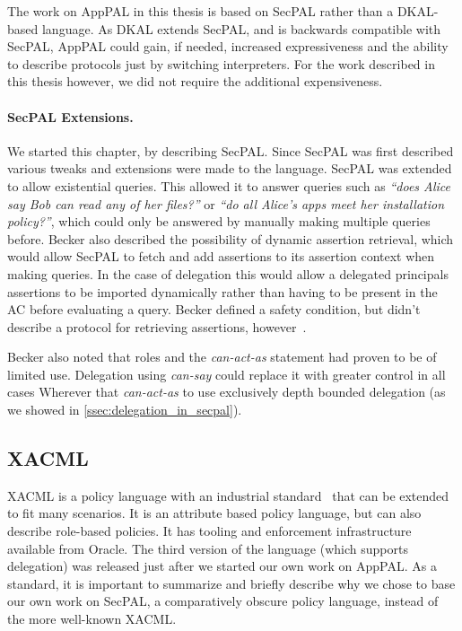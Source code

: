 \documentclass[thesis.tex]{subfiles}
\begin{document}
The work on AppPAL in this thesis is based on SecPAL rather than a DKAL-based language. 
As DKAL extends SecPAL, and is backwards compatible with SecPAL, AppPAL could gain, if needed,
increased expressiveness and the ability to describe protocols just by switching interpreters.
For the work described in this thesis however, we did not require the additional expensiveness.

\paragraph*{SecPAL Extensions.}
We started this chapter, by describing SecPAL. Since SecPAL was first described
various tweaks and extensions were made to the language. SecPAL was extended to
allow existential queries. This allowed it to answer
queries such as \emph{``does Alice say Bob can read any of her files?''} or
\emph{``do all Alice's apps meet her installation policy?''}, which could only
be answered by manually making multiple queries before. 
%
Becker also described the possibility of dynamic assertion retrieval, which
would allow SecPAL to fetch and add assertions to its assertion context when
making queries. In the case of delegation this would allow a delegated
principals assertions to be imported dynamically rather than having to be
present in the AC before evaluating a query. Becker defined a safety condition,
but didn't describe a protocol for retrieving assertions,
however~\cite{moritz_y_becker_secpal:_2009}.

Becker also noted that roles and the \emph{can-act-as} statement had proven to
be of limited use. Delegation using \emph{can-say} could replace it with greater
control in all cases Wherever that \emph{can-act-as} to use exclusively depth
bounded delegation (as we showed in \autoref{ssec:delegation_in_secpal}). 


\subsection{XACML}

XACML is a policy language with an industrial
standard~\cite{oasis_extensible_2013} that can be extended to fit many
scenarios. It is an attribute based policy language, but can also describe
role-based policies. It has tooling and enforcement infrastructure available
from Oracle.  The third version of the language (which supports delegation) was
released just after we started our own work on AppPAL.
%
As a standard, it is important to summarize and briefly describe
why we chose to base our own work on SecPAL, a comparatively obscure policy
language, instead of the more well-known XACML.
\end{document}
